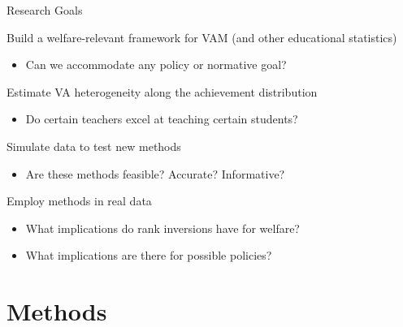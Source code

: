 \documentclass[11pt]{beamer}
\newenvironment{wideenumerate}{\enumerate\addtolength{\itemsep}{14pt}}{\endenumerate}
\begin{document}
\begin{frame}{Research Goals}

\begin{wideenumerate}
     \item Build a welfare-relevant framework for VAM (and other educational statistics) 
     \begin{itemize}
         \item Can we accommodate any policy or normative goal?
     \end{itemize}
    \item Estimate VA heterogeneity along the achievement distribution
    \begin{itemize}
        \item Do certain teachers excel at teaching certain students? 
    \end{itemize}
    \item Simulate data to test new methods
    \begin{itemize}
        \item Are these methods feasible? Accurate? Informative? 
    \end{itemize}
    \item Employ methods in real data
    \begin{itemize}
        \item What implications do rank inversions have for welfare?
        \item What implications are there for possible policies?
    \end{itemize}  

\end{wideenumerate}
\end{frame}





\section{Methods}

\end{document}
